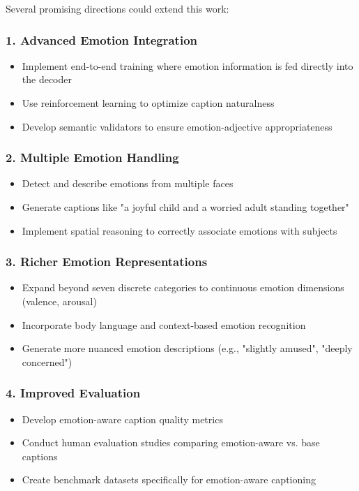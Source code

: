 \documentclass[12pt]{article}
\begin{document}
Several promising directions could extend this work:

\subsubsection{1. Advanced Emotion Integration}
\begin{itemize}
\item Implement end-to-end training where emotion information is fed directly into the decoder
\item Use reinforcement learning to optimize caption naturalness
\item Develop semantic validators to ensure emotion-adjective appropriateness
\end{itemize}

\subsubsection{2. Multiple Emotion Handling}
\begin{itemize}
\item Detect and describe emotions from multiple faces
\item Generate captions like "a joyful child and a worried adult standing together"
\item Implement spatial reasoning to correctly associate emotions with subjects
\end{itemize}

\subsubsection{3. Richer Emotion Representations}
\begin{itemize}
\item Expand beyond seven discrete categories to continuous emotion dimensions (valence, arousal)
\item Incorporate body language and context-based emotion recognition
\item Generate more nuanced emotion descriptions (e.g., "slightly amused", "deeply concerned")
\end{itemize}

\subsubsection{4. Improved Evaluation}
\begin{itemize}
\item Develop emotion-aware caption quality metrics
\item Conduct human evaluation studies comparing emotion-aware vs. base captions
\item Create benchmark datasets specifically for emotion-aware captioning
\end{itemize}
\end{document}
